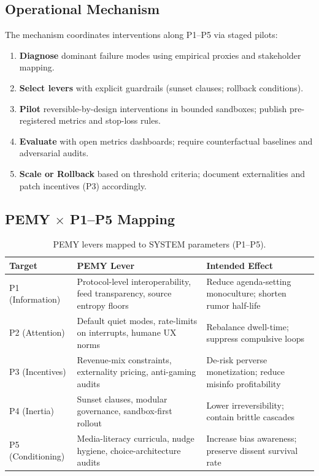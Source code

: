 \documentclass[11pt,a4paper]{article}
\theoremstyle{definition}
\theoremstyle{remark}
\begin{document}
\subsection{Operational Mechanism}
\label{app:pemy_mechanism}

The mechanism coordinates interventions along P1--P5 via staged pilots:
\begin{enumerate}
  \item \textbf{Diagnose} dominant failure modes using empirical proxies and stakeholder mapping.
  \item \textbf{Select levers} with explicit guardrails (sunset clauses; rollback conditions).
  \item \textbf{Pilot} reversible-by-design interventions in bounded sandboxes; publish pre-registered metrics and stop-loss rules.
  \item \textbf{Evaluate} with open metrics dashboards; require counterfactual baselines and adversarial audits.
  \item \textbf{Scale or Rollback} based on threshold criteria; document externalities and patch incentives (P3) accordingly.
\end{enumerate}

\subsection{PEMY $\times$ P1--P5 Mapping}
\label{app:pemy_p_mapping}

\begin{table}[H]
\centering
\caption{PEMY levers mapped to SYSTEM parameters (P1--P5).}
\label{tab:pemy_p_mapping}
\renewcommand{\arraystretch}{1.15}
\begin{tabularx}{\linewidth}{@{}lXX@{}}
\toprule
\textbf{Target} & \textbf{PEMY Lever} & \textbf{Intended Effect} \\
\midrule
P1 (Information) & Protocol-level interoperability, feed transparency, source entropy floors & Reduce agenda-setting monoculture; shorten rumor half-life \\
P2 (Attention) & Default quiet modes, rate-limits on interrupts, humane UX norms & Rebalance dwell-time; suppress compulsive loops \\
P3 (Incentives) & Revenue-mix constraints, externality pricing, anti-gaming audits & De-risk perverse monetization; reduce misinfo profitability \\
P4 (Inertia) & Sunset clauses, modular governance, sandbox-first rollout & Lower irreversibility; contain brittle cascades \\
P5 (Conditioning) & Media-literacy curricula, nudge hygiene, choice-architecture audits & Increase bias awareness; preserve dissent survival rate \\
\bottomrule
\end{tabularx}
\end{table}
\end{document}

